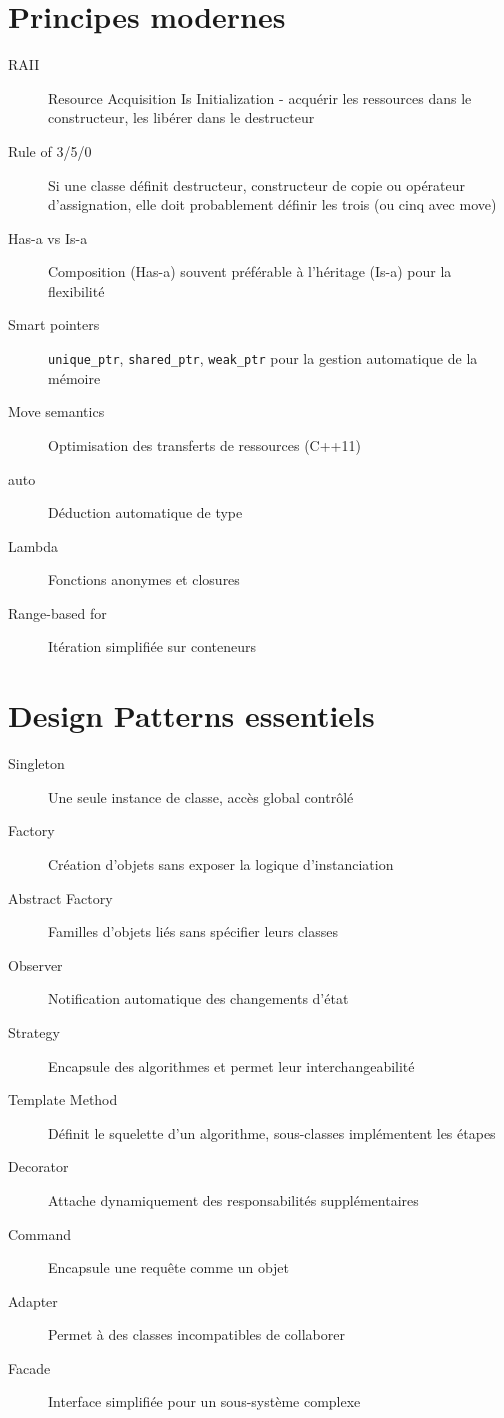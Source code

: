\documentclass{article}
\begin{document}
\begin{multicols*}{3}
\section*{Principes modernes}
\begin{description}
\item[RAII] Resource Acquisition Is Initialization - acquérir les ressources dans le constructeur, les libérer dans le destructeur
\item[Rule of 3/5/0] Si une classe définit destructeur, constructeur de copie ou opérateur d'assignation, elle doit probablement définir les trois (ou cinq avec move)
\item[Has-a vs Is-a] Composition (Has-a) souvent préférable à l'héritage (Is-a) pour la flexibilité
\item[Smart pointers] \texttt{unique\_ptr}, \texttt{shared\_ptr}, \texttt{weak\_ptr} pour la gestion automatique de la mémoire
\item[Move semantics] Optimisation des transferts de ressources (C++11)
\item[auto] Déduction automatique de type
\item[Lambda] Fonctions anonymes et closures
\item[Range-based for] Itération simplifiée sur conteneurs
\end{description}

\section*{Design Patterns essentiels}
\begin{description}
\item[Singleton] Une seule instance de classe, accès global contrôlé
\item[Factory] Création d'objets sans exposer la logique d'instanciation
\item[Abstract Factory] Familles d'objets liés sans spécifier leurs classes
\item[Observer] Notification automatique des changements d'état
\item[Strategy] Encapsule des algorithmes et permet leur interchangeabilité
\item[Template Method] Définit le squelette d'un algorithme, sous-classes implémentent les étapes
\item[Decorator] Attache dynamiquement des responsabilités supplémentaires
\item[Command] Encapsule une requête comme un objet
\item[Adapter] Permet à des classes incompatibles de collaborer
\item[Facade] Interface simplifiée pour un sous-système complexe
\end{description}


\end{multicols*}
\end{document}
